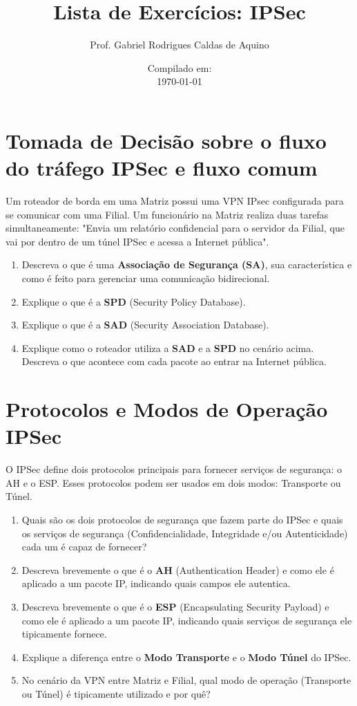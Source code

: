 \title{Lista de Exercícios: IPSec}
    \author{Prof. Gabriel Rodrigues Caldas de Aquino}
    \date{Compilado em: \\ \today}



\maketitle


\section{Tomada de Decisão sobre o fluxo do tráfego IPSec e fluxo comum}
Um roteador de borda em uma Matriz possui uma VPN IPsec configurada para se comunicar com uma Filial. Um funcionário na Matriz realiza duas tarefas simultaneamente: "Envia um relatório confidencial para o servidor da Filial, que vai por dentro de um túnel IPSec e acessa a Internet pública".

\begin{enumerate}
    \item Descreva o que é uma \textbf{Associação de Segurança (SA)}, sua característica e como é feito para gerenciar uma comunicação bidirecional.
    \item Explique o que é a \textbf{SPD} (Security Policy Database).
    \item Explique o que é a \textbf{SAD} (Security Association Database).
    \item Explique como o roteador utiliza a \textbf{SAD} e a \textbf{SPD} no cenário acima. Descreva o que acontece com cada pacote ao entrar na Internet pública.
\end{enumerate}

\section{Protocolos e Modos de Operação IPSec}
O IPSec define dois protocolos principais para fornecer serviços de segurança: o AH e o ESP. Esses protocolos podem ser usados em dois modos: Transporte ou Túnel.

\begin{enumerate}
    \item Quais são os dois protocolos de segurança que fazem parte do IPSec e quais os serviços de segurança (Confidencialidade, Integridade e/ou Autenticidade) cada um é capaz de fornecer?
    \item Descreva brevemente o que é o \textbf{AH} (Authentication Header) e como ele é aplicado a um pacote IP, indicando quais campos ele autentica.
    \item Descreva brevemente o que é o \textbf{ESP} (Encapsulating Security Payload) e como ele é aplicado a um pacote IP, indicando quais serviços de segurança ele tipicamente fornece.
    \item Explique a diferença entre o \textbf{Modo Transporte} e o \textbf{Modo Túnel} do IPSec.


    \item No cenário da VPN entre Matriz e Filial, qual modo de operação (Transporte ou Túnel) é tipicamente utilizado e por quê?
\end{enumerate}

